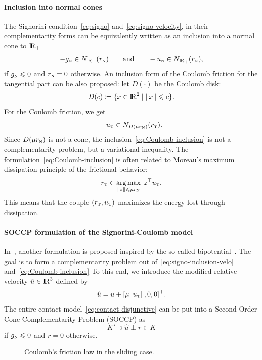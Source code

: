 {\paragraph{Inclusion into normal cones} The Signorini condition~\eqref{eq:signo} and~\eqref{eq:signo-velocity}, in their complementarity forms can be equivalently written  as an inclusion into a normal cone to $\mathrm{I\!R}_+$
\begin{equation}
 - g_\n \in N_{\RR_+}(r_\n)\qquad\text{and}\qquad
  - u_\n \in N_{\RR_+}(r_\n),
  \label{eq:signo-inclusion-velo}
\end{equation}
if $g_{{\hbox{\tiny{N}}}} \leqslant 0$ and $r_{\hbox{\tiny{N}}} =0 $ otherwise. An inclusion form of the Coulomb friction {for the tangential part} can be also proposed: let $D(\cdot)$ be the Coulomb disk:
\begin{equation}
  \label{eq:diskR}
  D(c) \coloneqq \{x\in \RR^2\mid \|x\| \leq c \}.
\end{equation}
For the Coulomb friction, we get
\begin{equation}
  \label{eq:Coulomb-inclusion}
  - u_{\t} \in N_{D(\mu r_\n)}(r_{\t}).
\end{equation}
Since $D(\mu r_{\hbox{\tiny{N}}})$ is not a cone, the inclusion~\eqref{eq:Coulomb-inclusion} is not a complementarity problem, but a variational inequality.
The formulation~\eqref{eq:Coulomb-inclusion} is often related to Moreau's maximum dissipation principle of the frictional behavior:
\begin{equation}
  \label{eq:moreau-maxprinciple}
  r_\t \in \argmax_{\|z\| \leq \mu r_\n}\;  z^\top u_\t.
\end{equation}
This means that the couple $(r_{\hbox{\tiny{T}}},u_{\hbox{\tiny{T}}})$ maximizes the energy lost through dissipation.


\paragraph{SOCCP formulation of the Signorini-Coulomb model}

In~\cite{Acary.Brogliato2008,Acary.ea_ZAMM2011}, another formulation is proposed inspired by the so-called bipotential~\cite{DeSaxce92,DeSaxce.Feng90,DeSaxce.Feng_MCM1998}.
{The goal is to form a complementarity problem out of~\eqref{eq:signo-inclusion-velo} and~\eqref{eq:Coulomb-inclusion}}
To this end, we introduce the modified relative velocity $\hat u \in \mathrm{I\!R}^3$ defined by
\begin{equation}
  \label{eq:modified-velocity}
  \hat u = u + [\mu \|u_\t\|, 0, 0]^\top.
\end{equation}
The entire contact model~\eqref{eq:contact-disjunctive} can be put into a Second-Order Cone Complementarity Problem (SOCCP) as
\begin{equation}
  \label{eq:contact-SOCCP}
 K^\star \ni \hat u \perp r \in K
\end{equation}
 if $ g_{\hbox{\tiny{N}}} \leqslant 0 $ and $r=0$ otherwise. 
\begin{figure}\centering
  \resizebox{!}{0.5\textheight}{}
  \caption{Coulomb's friction law in the sliding case.}
\label{fig:CoulombLawSliding}
\end{figure}

}
